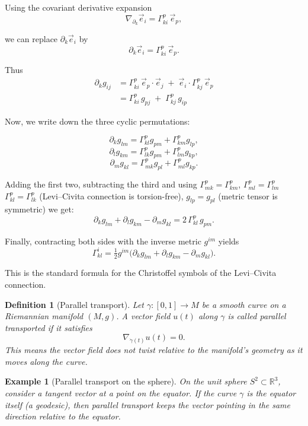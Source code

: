 \documentclass{article}
\newtheorem{definition}{Definition}
\newtheorem{example}{Example}
\begin{document}
Using the covariant derivative expansion
\[
\nabla_{\partial_k}\vec e_i
= \Gamma^p_{ki}\, \vec e_p,
\]

we can replace $\partial_k \vec e_i$ by
\[
\partial_k \vec e_i = \Gamma^p_{ki}\, \vec e_p.
\]

Thus
\[
\begin{aligned}
\partial_k g_{ij} &= \Gamma^p_{ki}\,\vec e_p\!\cdot\!\vec e_j \;+\; \vec e_i\!\cdot\!\Gamma^p_{kj}\,\vec e_p\\
&= \Gamma^p_{ki}\, g_{pj} \;+\; \Gamma^p_{kj}\, g_{ip}
\end{aligned}
\]


Now, we write down the three cyclic permutations:

\[
\partial_k g_{lm} = \Gamma^p_{kl} g_{pm} + \Gamma^p_{km} g_{lp},
\]
\[
\partial_l g_{km} = \Gamma^p_{lk} g_{pm} + \Gamma^p_{lm} g_{kp},
\]
\[
\partial_m g_{kl} = \Gamma^p_{mk} g_{pl} + \Gamma^p_{ml} g_{kp}.
\]

Adding the first two, subtracting the third and using $\Gamma^p_{mk} = \Gamma^p_{km}$, $\Gamma^p_{ml} = \Gamma^p_{lm}$ 
$\Gamma^p_{kl} = \Gamma^p_{lk}$ (Levi–Civita connection is torsion-free), $g_{lp} = g_{pl}$ (metric tensor is symmetric) we get:
\[
\partial_k g_{lm} + \partial_l g_{km} - \partial_m g_{kl}
= 2\,\Gamma^p_{kl}\, g_{pm}.
\]

Finally, contracting both sides with the inverse metric $g^{im}$ yields
\[
\Gamma^i_{kl}
= \tfrac{1}{2} g^{im}\big(
\partial_k g_{lm}
+ \partial_l g_{km}
- \partial_m g_{kl}
\big).
\]

This is the standard formula for the Christoffel symbols of the Levi--Civita connection.


\begin{definition}[Parallel transport]
Let $\gamma:[0,1]\to M$ be a smooth curve on a Riemannian manifold $(M,g)$. A vector field $u(t)$ along $\gamma$ is called \emph{parallel transported}
if it satisfies
\[
\nabla_{\dot\gamma(t)} u(t) = 0.
\]
This means the vector field does not twist relative to the manifold's geometry as it moves along the curve.
\end{definition}


\begin{example}[Parallel transport on the sphere]
On the unit sphere $S^2 \subset \mathbb{R}^3$, consider a tangent vector at a point on the equator. If the curve $\gamma$ is the equator itself 
(a geodesic), then parallel transport keeps the vector pointing in the  same direction relative to the equator.
\end{example}
\end{document}
